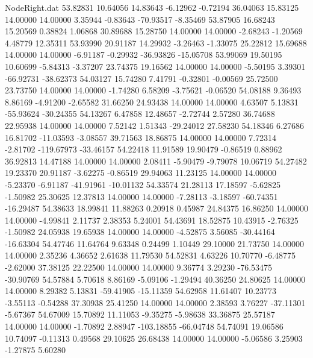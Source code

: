 \begin{filecontents}{NodeRight.dat}
  53.82831   10.64056   14.83643    -6.12962   -0.72194   36.04063   15.83125   14.00000   14.00000    3.35944   -0.83643  -70.93517   -8.35469
  53.87905   16.68243   15.20569     0.38824    1.06868   30.89688   15.28750   14.00000   14.00000   -2.68243   -1.20569    4.48779   12.35311
  53.93990   20.91187   14.29932    -3.26463   -1.33075   25.22812   15.69688   14.00000   14.00000   -6.91187   -0.29932  -36.93826  -15.05708
  53.99069   19.50195   10.60699    -5.84313   -3.37207   23.74375   19.16562   14.00000   14.00000   -5.50195    3.39301  -66.92731  -38.62373
  54.03127   15.74280    7.41791    -0.32801   -0.00569   25.72500   23.73750   14.00000   14.00000   -1.74280    6.58209   -3.75621   -0.06520
  54.08188    9.36493    8.86169    -4.91200   -2.65582   31.66250   24.93438   14.00000   14.00000    4.63507    5.13831  -55.93624  -30.24355
  54.13267    6.47858   12.48657    -2.72744    2.57280   36.74688   22.95938   14.00000   14.00000    7.52142    1.51343  -29.24012   27.58230
  54.18346    6.27686   16.81702   -11.03593   -3.08557   39.71563   18.86875   14.00000   14.00000    7.72314   -2.81702 -119.67973  -33.46157
  54.22418   11.91589   19.90479    -0.86519    0.88962   36.92813   14.47188   14.00000   14.00000    2.08411   -5.90479   -9.79078   10.06719
  54.27482   19.23370   20.91187    -3.62275   -0.86519   29.94063   11.23125   14.00000   14.00000   -5.23370   -6.91187  -41.91961  -10.01132
  54.33574   21.28113   17.18597    -5.62825   -1.50982   25.30625   12.37813   14.00000   14.00000   -7.28113   -3.18597  -60.74351  -16.29487
  54.38633   18.99841   11.88263     0.20918    0.45987   24.84375   16.86250   14.00000   14.00000   -4.99841    2.11737    2.38353    5.24001
  54.43691   18.52875   10.43915    -2.76325   -1.50982   24.05938   19.65938   14.00000   14.00000   -4.52875    3.56085  -30.44164  -16.63304
  54.47746   11.64764    9.63348     0.24499    1.10449   29.10000   21.73750   14.00000   14.00000    2.35236    4.36652    2.61638   11.79530
  54.52831    4.63226   10.70770    -6.48775   -2.62000   37.38125   22.22500   14.00000   14.00000    9.36774    3.29230  -76.53475  -30.90769
  54.57884    5.70618    8.86169    -5.09106   -1.29494   40.36250   24.80625   14.00000   14.00000    8.29382    5.13831  -59.41905  -15.11359
  54.62958   11.61407   10.23773    -3.55113   -0.54288   37.30938   25.41250   14.00000   14.00000    2.38593    3.76227  -37.11301   -5.67367
  54.67009   15.70892   11.11053    -9.35275   -5.98638   33.36875   25.57187   14.00000   14.00000   -1.70892    2.88947 -103.18855  -66.04748
  54.74091   19.06586   10.74097    -0.11313    0.49568   29.10625   26.68438   14.00000   14.00000   -5.06586    3.25903   -1.27875    5.60280

\end{filecontents}
